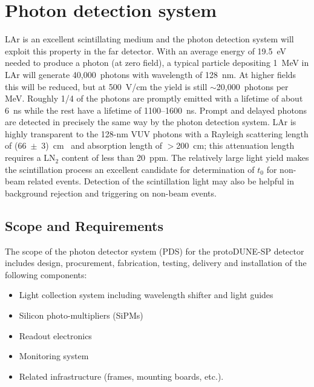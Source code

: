 
\section{Photon detection system}
\label{sec:pd_system}

LAr is an excellent scintillating medium and the photon detection
system will exploit this property in the far detector.  With an
average energy of 19.5~eV needed to produce a photon (at zero field),
a typical particle depositing 1~MeV in LAr will generate
40,000~photons with wavelength of 128~nm. At higher fields this will
be reduced, but at 500~V/cm the yield is still $\sim$20,000~photons
per MeV. Roughly 1/4 of the photons are promptly emitted with a
lifetime of about 6~ns while the rest have a lifetime of
1100--1600~ns. Prompt and delayed photons are detected in
  precisely the same way by the photon detection system. LAr is
highly transparent to the 128-nm VUV photons with a Rayleigh
scattering length of (66~$\pm$~3)~cm~\cite{Rayleigh} and absorption
length of $>$200~cm; this attenuation length requires a LN$_2$
  content of less than 20~ppm. The relatively large light yield makes
the scintillation process an excellent candidate for determination of
$t_0$ for non-beam related events. Detection of the scintillation
light may also be helpful in background rejection and triggering on
non-beam events.

\subsection{Scope and Requirements}

The scope of the photon detector system (PDS) for the protoDUNE-SP detector
includes design, procurement, fabrication,
testing, delivery and installation of the following components:
\begin{itemize}
\item Light collection system including wavelength shifter and light guides
\item Silicon photo-multipliers (SiPMs)
\item Readout electronics
\item Monitoring system
\item Related infrastructure (frames, mounting boards, etc.).
\end{itemize}

